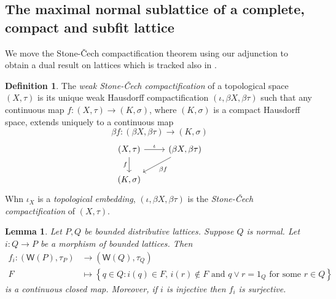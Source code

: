 \documentclass{article}
\newcommand{\corn}[1]{(\mathsf{W}(#1),\tau_{#1})}
\theoremstyle{plain}
\newtheorem{lemma}[theorem]{Lemma}
\theoremstyle{definition}
\newtheorem{definition}[theorem]{Definition}
\theoremstyle{remark}
\newcommand{\bp}[1]{\left\lbrace #1 \right\rbrace}
\newcommand{\0}{\mathbbm 0}
\newcommand{\1}{\mathbbm 1}
\newcommand{\2}{\mathbbm 2}
\begin{document}
\subsection{The maximal normal sublattice of a complete, compact and subfit lattice}
\label{subsection:maximalnormalsublattice}

We move the Stone-\v{C}ech compactification theorem using our adjunction to obtain a dual result on lattices which is tracked also in \cite[Section 9]{Chandler1998}.

\begin{definition}
\label{def:stonecech}
   The \emph{weak Stone-\v{C}ech compactification} of a topological space $(X,\tau)$ is its unique weak Hausdorff compactification $(\iota, \beta X, \beta \tau)$ such that any continuous map $f : (X,\tau) \rightarrow (K, \sigma)$, where $(K, \sigma)$ is a compact Hausdorff space, extends uniquely to a continuous map \[\beta f : (\beta X, \beta \tau) \rightarrow (K, \sigma)\]
\[
\begin{tikzcd}
(X, \tau) \arrow[r, "\iota"] \arrow[d, "f"'] & (\beta X, \beta \tau) \arrow[dl, "\beta f"] \\
(K, \sigma) &
\end{tikzcd}
\]
Whn $\iota_X$ is a \emph{topological embedding}, $(\iota,\beta X, \beta \tau)$ is the \emph{Stone-\v{C}ech compactification} of $(X, \tau)$.
\end{definition} 


\begin{lemma}
\label{lemma:morphism-norm-subfit}
    Let $P,Q$ be bounded distributive lattices. Suppose $Q$ is normal. Let $i: Q \to P$ be a morphism of bounded lattices. Then \begin{align*}
        f_i: \corn{P} &\to \corn{Q}  \\
        F &\mapsto \bp{q \in Q: i(q) \in F,\, i(r) \notin F \text{ and } q \vee r=1_Q \text{ for some } r \in Q}
    \end{align*}
    is a continuous closed map. Moreover, if $i$ is injective then  $ f_i$ is surjective. 
    \end{lemma}
    
\end{document}

